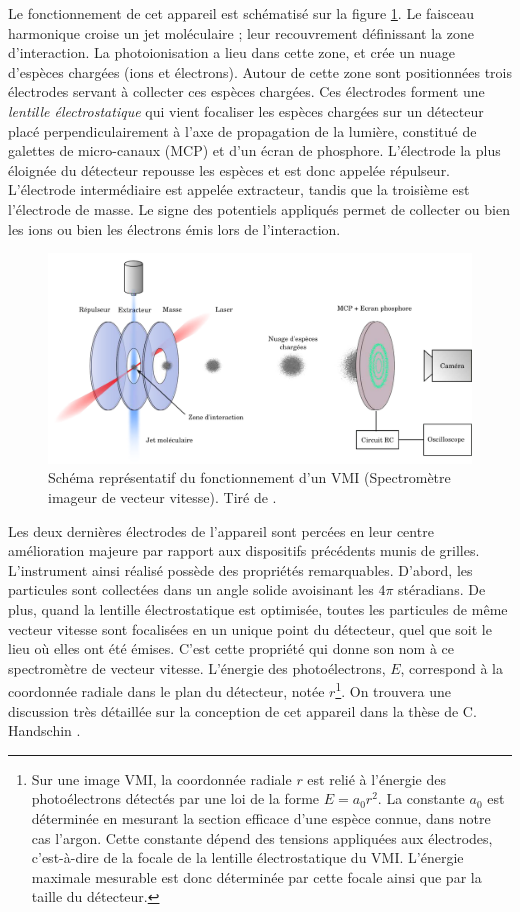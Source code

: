 Le fonctionnement de cet appareil est schématisé sur la figure \ref{fig:vmi}. Le faisceau harmonique croise un jet moléculaire ; leur recouvrement définissant la zone d'interaction. La photoionisation a lieu dans cette zone, et crée un nuage d'espèces chargées (ions et électrons). Autour de cette zone sont positionnées trois électrodes servant à collecter ces espèces chargées. Ces électrodes forment une \textit{lentille électrostatique} qui vient focaliser les espèces chargées sur un détecteur placé perpendiculairement à l'axe de propagation de la lumière, constitué de galettes de micro-canaux (MCP) et d'un écran de phosphore. L'électrode la plus éloignée du détecteur repousse les espèces et est donc appelée répulseur. L'électrode intermédiaire est appelée extracteur, tandis que la troisième est l'électrode de masse. Le signe des potentiels appliqués permet de collecter ou bien les ions ou bien les électrons émis lors de l'interaction. 

\begin{figure}[!ht]
\centering
\includegraphics[width=1\columnwidth]{Figures/PECD/vmi.png}%
\caption{Schéma représentatif du fonctionnement d'un VMI (Spectromètre imageur de vecteur vitesse). Tiré de .}
\label{fig:vmi}
\end{figure}

Les deux dernières électrodes de l'appareil sont percées en leur centre  amélioration majeure par rapport aux dispositifs précédents munis de grilles. L'instrument ainsi réalisé possède des propriétés remarquables. D'abord, les particules sont collectées dans un angle solide avoisinant les $4\pi$ stéradians. De plus, quand la lentille électrostatique est optimisée, toutes les particules de même vecteur vitesse sont focalisées en un unique point du détecteur, quel que soit le lieu où elles ont été émises. C'est cette propriété qui donne son nom à ce spectromètre de vecteur vitesse. L'énergie des photoélectrons, $E$, correspond à la coordonnée radiale dans le plan du détecteur, notée $r$\footnote{Sur une image VMI, la coordonnée radiale $r$ est relié à l'énergie des photoélectrons détectés par une loi de la forme $E = a_0 r^2$. La constante $a_0$ est déterminée en mesurant la section efficace d'une espèce connue, dans notre cas l'argon. Cette constante dépend des tensions appliquées aux électrodes, c'est-à-dire de la focale de la lentille électrostatique du VMI. L'énergie maximale mesurable est donc déterminée par cette focale ainsi que par la taille du détecteur. }. On trouvera une discussion très détaillée sur la conception de cet appareil dans la thèse de C. Handschin .

